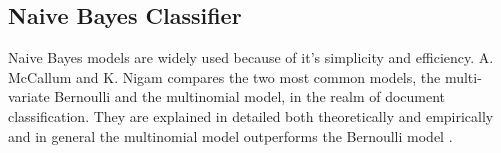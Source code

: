 	\subsection{Naive Bayes Classifier}
	Naive Bayes models are widely used because of it's simplicity and efficiency. A. McCallum and K. Nigam compares the two most common models, the multi-variate Bernoulli and the multinomial model, in the realm of document classification. They are explained in detailed both theoretically and empirically and in general the multinomial model outperforms the Bernoulli model \cite{Zhang04optimality}.